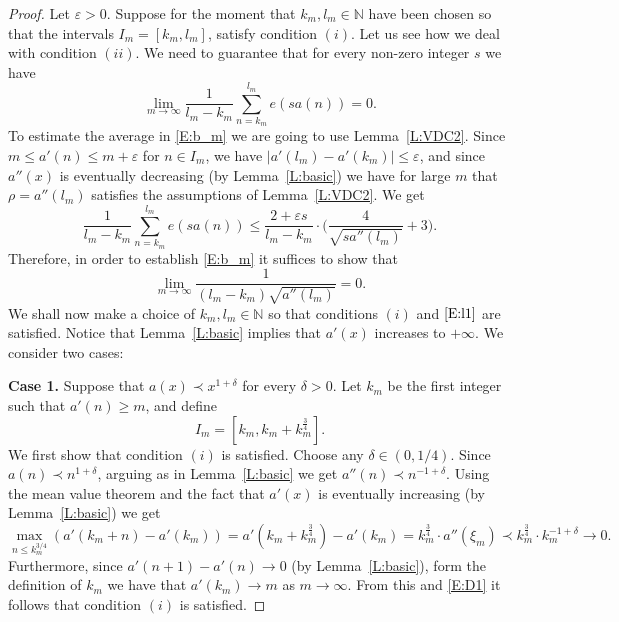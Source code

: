 \documentclass[11pt]{amsart}
\newcommand{\N}{\mathbb{N}}
\theoremstyle{plain}
\theoremstyle{definition}
\theoremstyle{remark}
\begin{document}
\begin{proof}
  Let $\varepsilon>0$. Suppose for the moment that $k_m,l_m\in\N$ have been chosen so
  that the intervals $I_m=[k_m,l_m]$, satisfy condition $(i)$. Let us
  see how we deal with condition $(ii)$. We need to guarantee that for
  every non-zero integer $s$ we have
  \begin{equation}\label{E:b_m}
    \lim_{m\to\infty} \frac{1}{l_m-k_m}\sum_{n=k_m}^{l_m} e(sa(n))=0.
  \end{equation}
  To estimate the  average in \eqref{E:b_m} we are going to use Lemma~\ref{L:VDC2}.
  Since $m\leq a'(n)\leq m+\varepsilon$ for $n\in I_m$, we have
  $|a'(l_m)-a'(k_m)|\leq \varepsilon$, and since $a''(x)$ is
  eventually decreasing (by Lemma~\ref{L:basic}) we have for large $m$
  that $\rho=a''(l_m)$ satisfies the assumptions of
  Lemma~\ref{L:VDC2}.  We get
$$
\frac{1}{l_m-k_m}\sum_{n=k_m}^{l_m} e(sa(n))\leq \frac{2+\varepsilon
  s}{l_m-k_m} \cdot \Big(\frac{4}{\sqrt{sa''(l_m)}}+3\Big).
$$
Therefore,  in order to establish \eqref{E:b_m} it suffices to show that
\begin{equation}\label{E:l1}
  \lim_{m\to\infty}\frac{1}{(l_m-k_m)\sqrt{a''(l_m)}}=0.
\end{equation}
We shall now make a choice of $k_m,l_m\in\N$ so that conditions $(i)$
and $\eqref{E:l1}$ are satisfied.  Notice that Lemma~\ref{L:basic} implies that $a'(x)$ increases to  $+\infty$. We consider two cases:

{\bf Case 1.} Suppose that $a(x)\prec x^{1+\delta}$ for every
$\delta>0$.  Let $k_m$ be the first integer such that $a'(n)\geq m$,
and define
$$
I_m=[k_m,k_m+k_m^{\frac{3}{4}}].
$$
We first show that condition $(i)$ is satisfied. Choose any $\delta\in
(0,1/4)$. Since $a(n)\prec n^{1+\delta}$, arguing as in
Lemma~\ref{L:basic} we get $a''(n)\prec n^{-1+\delta}$. Using the mean
value theorem and the fact that $a'(x)$ is eventually increasing (by
Lemma~\ref{L:basic}) we get
\begin{equation}\label{E:D1}
  \max_{n\leq k_m^{3/4}}(a'(k_m+n)-a'(k_m))= a'(k_m+ k_m^{\frac{3}{4}})-a'(k_m)= k_m^{\frac{3}{4}} \cdot a''(\xi_m)\prec
  k_m^{\frac{3}{4}}\cdot k_m^{-1+\delta}\to 0.
\end{equation}
Furthermore, since $a'(n+1)-a'(n)\to 0$ (by Lemma~\ref{L:basic}), form the definition of $k_m$
 we have that
$a'(k_m)\to m$ as $m\to\infty$.  From this and \eqref{E:D1} it follows
that condition $(i)$ is
satisfied.


\end{proof}
\end{document}
